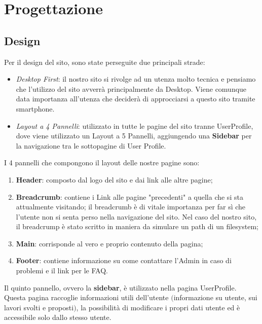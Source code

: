 \section{Progettazione}
	
  \subsection{Design}
  Per il design del sito, sono state perseguite due principali strade:
  \begin{itemize}
    \item \textit{Desktop First}: il nostro sito si rivolge ad un utenza molto tecnica e pensiamo che l'utilizzo del sito avverrà principalmente da Desktop. Viene comunque data importanza all'utenza che deciderà di approcciarsi a questo sito tramite smartphone.
    \item \textit{Layout a 4 Pannelli}: utilizzato in tutte le pagine del sito tranne UserProfile, dove viene utilizzato un Layout a 5 Pannelli, aggiungendo una \textbf{Sidebar} per la navigazione tra le sottopagine di User Profile.
  \end{itemize}

  I 4 pannelli che compongono il layout delle nostre pagine sono:
  \begin{enumerate}
    \item \textbf{Header}: composto dal logo del sito e dai link alle altre pagine;
    \item \textbf{Breadcrumb}: contiene i Link alle pagine "precedenti" a quella che si sta attualmente visitando; il breadcrumb è di vitale importanza per far sì che l'utente
      non si senta perso nella navigazione del sito. Nel caso del nostro sito, il breadcrump è stato scritto in maniera da simulare un path di un filesystem;
    \item \textbf{Main}: corrisponde al vero e proprio contenuto della pagina;
    \item \textbf{Footer}: contiene informazione su come contattare l'Admin in caso di problemi e il link per le FAQ.
  \end{enumerate}
  
  Il quinto pannello, ovvero la \textbf{sidebar}, è utilizzato nella pagina UserProfile. 
  Questa pagina raccoglie informazioni utili dell'utente $($informazione su utente, sui lavori svolti e proposti$)$, la possibilità di modificare i propri dati utente ed è accessibile solo dallo stesso utente.


